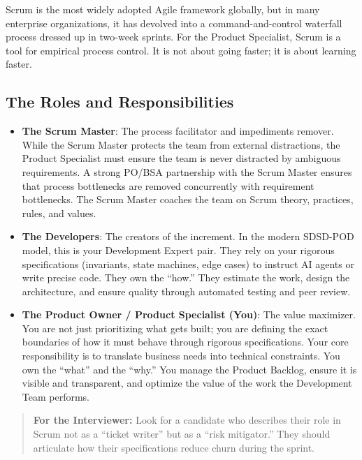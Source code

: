 Scrum is the most widely adopted Agile framework globally, but in many
enterprise organizations, it has devolved into a command-and-control
waterfall process dressed up in two-week sprints. For the Product
Specialist, Scrum is a tool for empirical process control. It is not
about going faster; it is about learning faster.

\subsection{The Roles and
Responsibilities}\label{the-roles-and-responsibilities}

\begin{itemize}
\tightlist
\item
  \textbf{The Scrum Master}: The process facilitator and impediments
  remover. While the Scrum Master protects the team from external
  distractions, the Product Specialist must ensure the team is never
  distracted by ambiguous requirements. A strong PO/BSA partnership with
  the Scrum Master ensures that process bottlenecks are removed
  concurrently with requirement bottlenecks. The Scrum Master coaches
  the team on Scrum theory, practices, rules, and values.
\item
  \textbf{The Developers}: The creators of the increment. In the modern
  SDSD-POD model, this is your Development Expert pair. They rely on
  your rigorous specifications (invariants, state machines, edge cases)
  to instruct AI agents or write precise code. They own the ``how.''
  They estimate the work, design the architecture, and ensure quality
  through automated testing and peer review.
\item
  \textbf{The Product Owner / Product Specialist (You)}: The value
  maximizer. You are not just prioritizing what gets built; you are
  defining the exact boundaries of how it must behave through rigorous
  specifications. Your core responsibility is to translate business
  needs into technical constraints. You own the ``what'' and the
  ``why.'' You manage the Product Backlog, ensure it is visible and
  transparent, and optimize the value of the work the Development Team
  performs.
\end{itemize}

\begin{quote}
\textbf{For the Interviewer:} Look for a candidate who describes their
role in Scrum not as a ``ticket writer'' but as a ``risk mitigator.''
They should articulate how their specifications reduce churn during the
sprint.
\end{quote}

